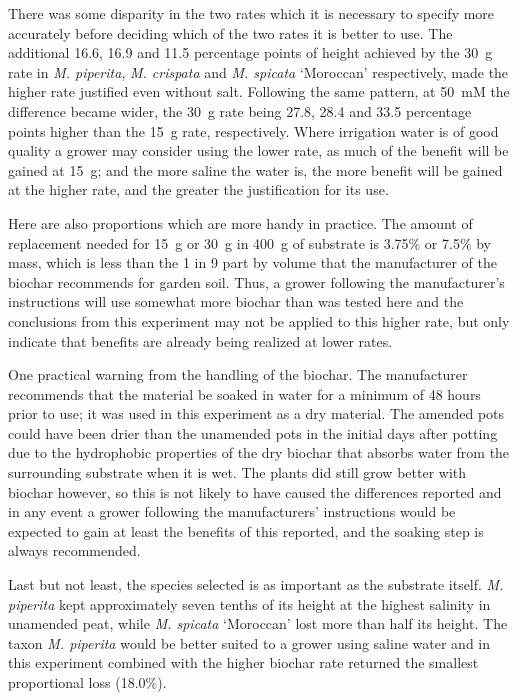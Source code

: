 There was some disparity in the two rates which it is necessary to specify more accurately before deciding which of the two rates it is better to use. The additional 16.6, 16.9 and 11.5 percentage points of height achieved by the 30~g rate in \textit{M. piperita}, \textit{M. crispata} and \textit{M. spicata} `Moroccan' respectively, made the higher rate justified even without salt. Following the same pattern, at 50~mM the difference became wider, the 30~g rate being 27.8, 28.4 and 33.5 percentage points higher than the 15~g rate, respectively. Where irrigation water is of good quality a grower may consider using the lower rate, as much of the benefit will be gained at 15~g; and the more saline the water is, the more benefit will be gained at the higher rate, and the greater the justification for its use.

Here are also proportions which are more handy in practice. The amount of replacement needed for 15~g or 30~g in 400~g of substrate is 3.75\% or 7.5\% by mass, which is less than the 1 in 9 part by volume that the manufacturer of the biochar recommends for garden soil. Thus, a grower following the manufacturer's instructions will use somewhat more biochar than was tested here and the conclusions from this experiment may not be applied to this higher rate, but only indicate that benefits are already being realized at lower rates.

One practical warning from the handling of the biochar. The manufacturer recommends that the material be soaked in water for a minimum of 48 hours prior to use; it was used in this experiment as a dry material. The amended pots could have been drier than the unamended pots in the initial days after potting due to the hydrophobic properties of the dry biochar that absorbs water from the surrounding substrate when it is wet. The plants did still grow better with biochar however, so this is not likely to have caused the differences reported and in any event a grower following the manufacturers' instructions would be expected to gain at least the benefits of this reported, and the soaking step is always recommended.

Last but not least, the species selected is as important as the substrate itself. \textit{M. piperita} kept approximately seven tenths of its height at the highest salinity in unamended peat, while \textit{M. spicata} `Moroccan' lost more than half its height. The taxon \textit{M. piperita} would be better suited to a grower using saline water and in this experiment combined with the higher biochar rate returned the smallest proportional loss (18.0\%).

